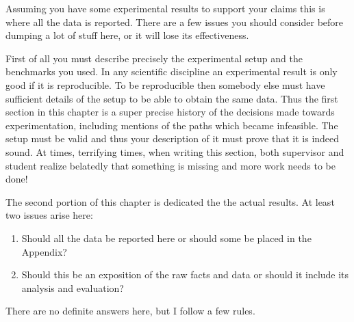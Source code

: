 \label{chapter:Exp}

Assuming you have some experimental results to support your claims this is where all the data is reported. There are a few issues you should consider before dumping a lot of stuff here, or it will lose its effectiveness.

First of all you must describe precisely the experimental setup and the benchmarks you used. In any scientific discipline an experimental result is only good if it is reproducible. To be reproducible then somebody else must have sufficient details of the setup to be able to obtain the same data. Thus the first section in this chapter is a super precise history of the decisions made towards experimentation, including mentions of the paths which became infeasible. The setup must be valid and thus your description of it must prove that it is indeed sound. At times, terrifying times, when writing this section, both supervisor and student realize belatedly that something is missing and more work needs to be done!

The second portion of this chapter is dedicated the the actual results. At least two issues arise here:
\begin{enumerate}
\item {Should all the data be reported here or should some be placed in the Appendix?}
\item {Should this be an exposition of the raw facts and data or should it include its analysis and evaluation?}
\end{enumerate}

There are no definite answers here, but I follow a few rules.

